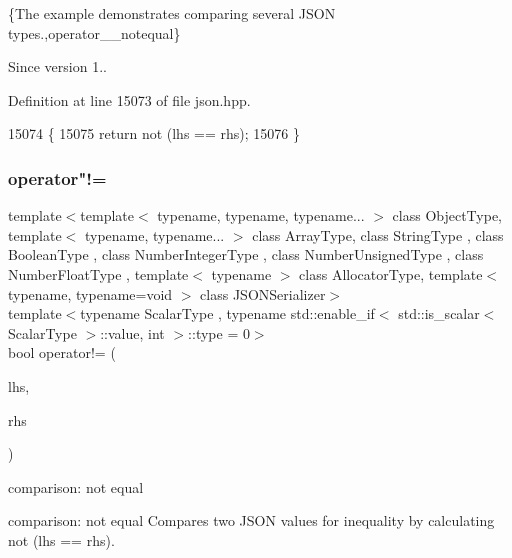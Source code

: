 \{The example demonstrates comparing several J\+S\+ON types.,operator\+\_\+\+\_\+notequal\}

\begin{DoxySince}{Since}
version 1.. 
\end{DoxySince}


Definition at line 15073 of file json.\+hpp.


\begin{DoxyCode}
15074     \{
15075         \textcolor{keywordflow}{return} not (lhs == rhs);
15076     \}
\end{DoxyCode}
\mbox{\label{classnlohmann_1_1basic__json_afefc38fc08bdb7a9a7474b5ab4a1140f}} 
\subsubsection{\texorpdfstring{operator"!=}{operator!=}\hspace{0.1cm}{\footnotesize\ttfamily [2/3]}}
{\footnotesize\ttfamily template$<$template$<$ typename, typename, typename... $>$ class Object\+Type, template$<$ typename, typename... $>$ class Array\+Type, class String\+Type , class Boolean\+Type , class Number\+Integer\+Type , class Number\+Unsigned\+Type , class Number\+Float\+Type , template$<$ typename $>$ class Allocator\+Type, template$<$ typename, typename=void $>$ class J\+S\+O\+N\+Serializer$>$ \\
template$<$typename Scalar\+Type , typename std\+::enable\+\_\+if$<$ std\+::is\+\_\+scalar$<$ Scalar\+Type $>$\+::value, int $>$\+::type  = 0$>$ \\
bool operator!= (\begin{DoxyParamCaption}\item[{\hyperlink{classnlohmann_1_1basic__json_a4057c5425f4faacfe39a8046871786ca}{const\+\_\+reference}}]{lhs,  }\item[{const Scalar\+Type}]{rhs }\end{DoxyParamCaption})\hspace{0.3cm}{\ttfamily [friend]}}



comparison\+: not equal 

comparison\+: not equal Compares two J\+S\+ON values for inequality by calculating {\ttfamily not (lhs == rhs)}.


